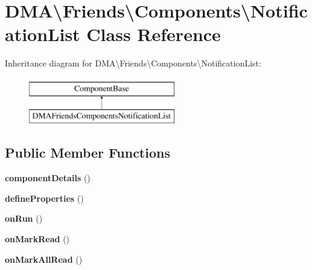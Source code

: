 \hypertarget{classDMA_1_1Friends_1_1Components_1_1NotificationList}{\section{D\+M\+A\textbackslash{}Friends\textbackslash{}Components\textbackslash{}Notification\+List Class Reference}
\label{classDMA_1_1Friends_1_1Components_1_1NotificationList}
}
Inheritance diagram for D\+M\+A\textbackslash{}Friends\textbackslash{}Components\textbackslash{}Notification\+List\+:\begin{figure}[H]
\begin{center}
\leavevmode
\includegraphics[height=2.000000cm]{dc/d03/classDMA_1_1Friends_1_1Components_1_1NotificationList}
\end{center}
\end{figure}
\subsection*{Public Member Functions}
\begin{DoxyCompactItemize}
\item 
\hypertarget{classDMA_1_1Friends_1_1Components_1_1NotificationList_a5f6b1107482bf7d15e379cad1c58e537}{{\bfseries component\+Details} ()}\label{classDMA_1_1Friends_1_1Components_1_1NotificationList_a5f6b1107482bf7d15e379cad1c58e537}

\item 
\hypertarget{classDMA_1_1Friends_1_1Components_1_1NotificationList_a0e98d6eba8a7d10629c7a0e051937d98}{{\bfseries define\+Properties} ()}\label{classDMA_1_1Friends_1_1Components_1_1NotificationList_a0e98d6eba8a7d10629c7a0e051937d98}

\item 
\hypertarget{classDMA_1_1Friends_1_1Components_1_1NotificationList_a5756b2cf174bc7919896c256ad9f44aa}{{\bfseries on\+Run} ()}\label{classDMA_1_1Friends_1_1Components_1_1NotificationList_a5756b2cf174bc7919896c256ad9f44aa}

\item 
\hypertarget{classDMA_1_1Friends_1_1Components_1_1NotificationList_aea88b4438deaa71ced9f3cdc53cb0d94}{{\bfseries on\+Mark\+Read} ()}\label{classDMA_1_1Friends_1_1Components_1_1NotificationList_aea88b4438deaa71ced9f3cdc53cb0d94}

\item 
\hypertarget{classDMA_1_1Friends_1_1Components_1_1NotificationList_a8dfae281c32e5b31c7dbab3fe91d74f1}{{\bfseries on\+Mark\+All\+Read} ()}\label{classDMA_1_1Friends_1_1Components_1_1NotificationList_a8dfae281c32e5b31c7dbab3fe91d74f1}

\end{DoxyCompactItemize}

